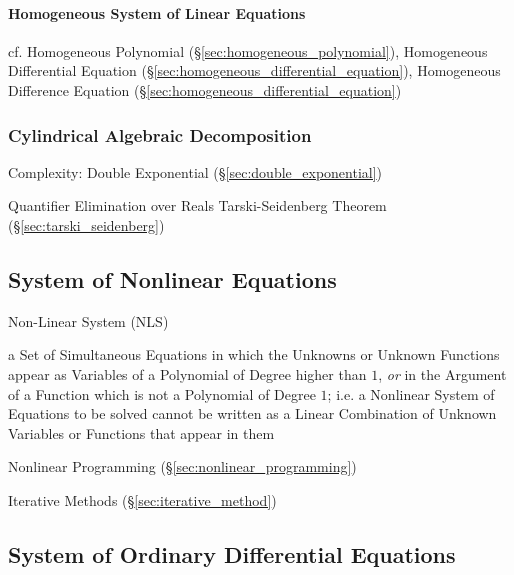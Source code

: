 \paragraph{Homogeneous System of Linear Equations}\hfill
\label{sec:homogeneous_system}

cf. Homogeneous Polynomial (\S\ref{sec:homogeneous_polynomial}), Homogeneous
Differential Equation (\S\ref{sec:homogeneous_differential_equation}),
Homogeneous Difference Equation (\S\ref{sec:homogeneous_differential_equation})



\subsubsection{Cylindrical Algebraic Decomposition}
\label{sec:cylindrical_algebraic_decomposition}

Complexity: Double Exponential (\S\ref{sec:double_exponential})

Quantifier Elimination over Reals \fist Tarski-Seidenberg Theorem
(\S\ref{sec:tarski_seidenberg})



\subsection{System of Nonlinear Equations}
\label{sec:system_of_nonlinear_equations}

Non-Linear System (NLS)

a Set of Simultaneous Equations in which the Unknowns or Unknown Functions
appear as Variables of a Polynomial of Degree higher than $1$, \emph{or} in the
Argument of a Function which is not a Polynomial of Degree $1$; i.e. a
Nonlinear System of Equations to be solved cannot be written as a Linear
Combination of Unknown Variables or Functions that appear in them

\fist Nonlinear Programming (\S\ref{sec:nonlinear_programming})

\fist Iterative Methods (\S\ref{sec:iterative_method})



\subsection{System of Ordinary Differential Equations}
\label{sec:system_of_odes}

